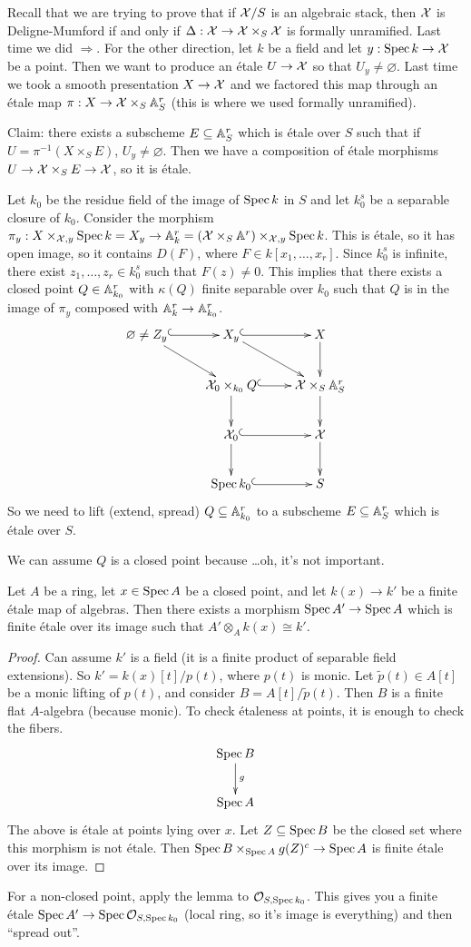 Recall that we are trying to prove that if $\X/S$ is an algebraic stack, then $\X$ is Deligne-Mumford if and only if $\Delta:\X\to\X\times_S \X$ is formally unramified. Last time we did $\Rightarrow$. For the other direction, let $k$ be a field and let $y:\spec k\to \X$ be a point. Then we want to produce an \'etale $U\to \X$ so that $U_y\neq\varnothing$. Last time we took a smooth presentation $X\to \X$ and we factored this map through an \'etale map $\pi:X\to \X\times_S \AA^r_S$ (this is where we used formally unramified).

Claim: there exists a subscheme $E\subseteq \AA^r_S$ which is \'etale over $S$ such that if $U=\pi^{-1}(X\times_S E)$, $U_y\neq\varnothing$. Then we have a composition of \'etale morphisms $U\to \X\times_S E\to \X$, so it is \'etale.
 
Let $k_0$ be the residue field of the image of $\spec k$ in $S$ and let $k_0^s$ be a separable closure of $k_0$. Consider the morphism $\pi_y:X\times_{\X,y}\spec k=X_y\to \AA^r_k=(\X\times_S \AA^r)\times_{\X,y}\spec k$. This is \'etale, so it has open image, so it contains $D(F)$, where $F\in k[x_1,\dots, x_r]$. Since $k_0^s$ is infinite, there exist $z_1,\dots, z_r\in k_0^s$ such that $F(z)\neq 0$. This implies that there exists a closed point $Q\in \AA^r_{k_0}$ with $\kappa(Q)$ finite separable over $k_0$ such that $Q$ is in the image of $\pi_y$ composed with $\AA^r_k\to \AA^r_{k_0}$.\anton{}
\[\xymatrix{
  \varnothing\neq Z_y\ar@{^(->}[r]\ar[dr] &X_y\ar[dr]\ar@{^(->}[r] & X\ar[d]\\
  &\X_0\times_{k_0} Q \ar@{^(->}[r]\ar[d] & \X\times_S \AA^r_S \ar[d]\\
  &\X_0 \ar@{^(->}[r]\ar[d]& \X\ar[d]\\
  &\spec k_0\ar@{^(->}[r] & S
}\]
So we need to lift (extend, spread) $Q\subseteq \AA^r_{k_0}$ to a subscheme $E\subseteq \AA^r_S$ which is \'etale over $S$.

We can assume $Q$ is a closed point because \dots oh, it's not important.
\begin{lemma}
 Let $A$ be a ring, let $x\in \spec A$ be a closed point, and let $k(x)\to k'$ be a finite \'etale map of algebras. Then there exists a morphism $\spec A'\to \spec A$ which is finite \'etale over its image such that $A'\otimes_A k(x)\cong k'$.
\end{lemma}
\begin{proof}
 Can assume $k'$ is a field (it is a finite product of separable field extensions). So $k'=k(x)[t]/p(t)$, where $p(t)$ is monic. Let $\tilde p(t)\in A[t]$ be a monic lifting of $p(t)$, and consider $B=A[t]/\tilde p(t)$. Then $B$ is a finite flat $A$-algebra (because monic). To check \'etaleness at points, it is enough to check the fibers.
 \[\xymatrix{
  \spec B\ar[d]^g\\
  \spec A
 }\]
 The above is \'etale at points lying over $x$. Let $Z\subseteq \spec B$ be the closed set where this morphism is not \'etale. Then $\spec B\times_{\spec A}g(Z)^c\to \spec A$ is finite \'etale over its image.
\end{proof}
For a non-closed point, apply the lemma to $\O_{S,\spec k_0}$. This gives you a finite \'etale $\spec A'\to \spec \O_{S,\spec k_0}$ (local ring, so it's image is everything) and then ``spread out''.

